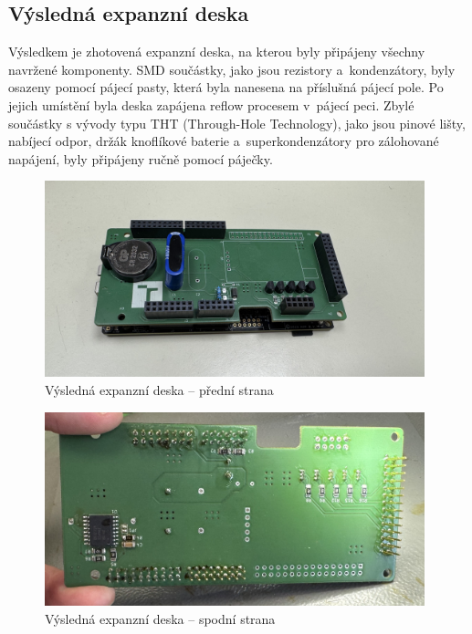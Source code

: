 \newpage

\subsection{Výsledná expanzní deska}
\label{vysledek}
Výsledkem je zhotovená expanzní deska, na kterou byly připájeny všechny navržené komponenty. SMD součástky, jako jsou rezistory a~kondenzátory, byly osazeny pomocí pájecí pasty, která byla nanesena na příslušná pájecí pole. Po jejich umístění byla deska zapájena reflow procesem v~pájecí peci. Zbylé součástky s vývody typu THT (Through-Hole Technology), jako jsou pinové lišty, nabíjecí odpor, držák knoflíkové baterie a~superkondenzátory pro zálohované napájení, byly připájeny ručně pomocí páječky.

\begin{figure}[h]
    \centering
    \includegraphics[width=0.98\textwidth]{obrazky-figures/datalogger.jpg}
    
    \caption{Výsledná expanzní deska -- přední strana}
    \label{fig:expansion-board}
\end{figure}

\begin{figure}[h]
    \centering
    \includegraphics[width=0.98\textwidth]{obrazky-figures/expansion-shield-back.jpg}
    
    \caption{Výsledná expanzní deska -- spodní strana}
    \label{fig:expansion-board-back}
\end{figure}

